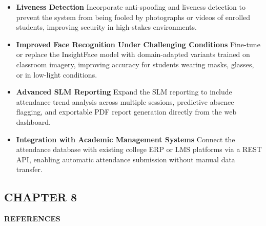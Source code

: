 \documentclass{report}
\begin{document}
\begin{itemize}
\item \textbf{Liveness Detection}
Incorporate anti-spoofing and liveness detection to prevent the system from being fooled by\vspace{3pt} photographs or videos of enrolled students, improving security in high-stakes environments.

\item \textbf{Improved Face Recognition Under Challenging Conditions}
Fine-tune or replace the InsightFace model with domain-adapted variants trained on classroom\vspace{3pt} imagery, improving accuracy for students wearing masks, glasses, or in low-light conditions.

\item \textbf{Advanced SLM Reporting}
Expand the SLM reporting to include attendance trend analysis across multiple sessions,\vspace{3pt} predictive absence flagging, and exportable PDF report generation directly from the web\vspace{3pt} dashboard.

\item \textbf{Integration with Academic Management Systems}
Connect the attendance database with existing college ERP or LMS platforms via a REST API,\vspace{3pt} enabling automatic attendance submission without manual data transfer.

\end{itemize}

\newpage
\begin{center}
    \section*{\textbf{CHAPTER 8}}
\end{center}
\begin{center}
    \textbf{\Large REFERENCES}\\[20pt]
\end{center}
\end{document}
